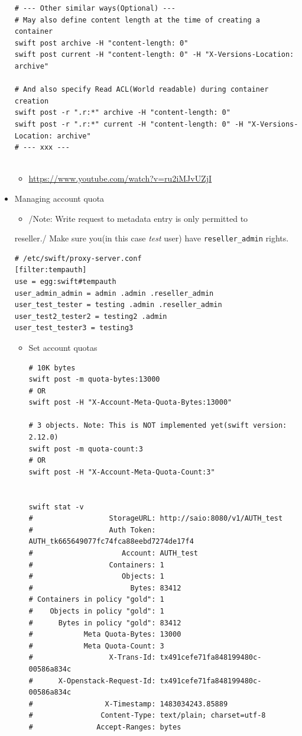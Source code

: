 \documentclass{article}
\begin{document}
\begin{itemize}
\begin{verbatim}
# --- Other similar ways(Optional) ---
# May also define content length at the time of creating a container
swift post archive -H "content-length: 0"
swift post current -H "content-length: 0" -H "X-Versions-Location: archive"

# And also specify Read ACL(World readable) during container creation
swift post -r ".r:*" archive -H "content-length: 0"
swift post -r ".r:*" current -H "content-length: 0" -H "X-Versions-Location: archive"
# --- xxx ---


\end{verbatim}

\begin{itemize}
\item \url{https://www.youtube.com/watch?v=ru2iMJvUZjI}
\end{itemize}

\item Managing account quota

\begin{itemize}
\item /Note: Write request to metadata entry is only permitted to
\end{itemize}
reseller./ Make sure you(in this case \emph{test} user) have
\texttt{reseller\_admin} rights.

\begin{verbatim}
# /etc/swift/proxy-server.conf
[filter:tempauth]
use = egg:swift#tempauth
user_admin_admin = admin .admin .reseller_admin
user_test_tester = testing .admin .reseller_admin
user_test2_tester2 = testing2 .admin
user_test_tester3 = testing3
\end{verbatim}

\begin{itemize}
\item Set account quotas

\begin{verbatim}
# 10K bytes
swift post -m quota-bytes:13000
# OR
swift post -H "X-Account-Meta-Quota-Bytes:13000"

# 3 objects. Note: This is NOT implemented yet(swift version: 2.12.0)
swift post -m quota-count:3
# OR
swift post -H "X-Account-Meta-Quota-Count:3"


swift stat -v
#                  StorageURL: http://saio:8080/v1/AUTH_test
#                  Auth Token: AUTH_tk665649077fc74fca88eebd7274de17f4
#                     Account: AUTH_test
#                  Containers: 1
#                     Objects: 1
#                       Bytes: 83412
# Containers in policy "gold": 1
#    Objects in policy "gold": 1
#      Bytes in policy "gold": 83412
#            Meta Quota-Bytes: 13000
#            Meta Quota-Count: 3
#                  X-Trans-Id: tx491cefe71fa848199480c-00586a834c
#      X-Openstack-Request-Id: tx491cefe71fa848199480c-00586a834c
#                 X-Timestamp: 1483034243.85889
#                Content-Type: text/plain; charset=utf-8
#               Accept-Ranges: bytes



\end{verbatim}
\end{itemize}
\end{itemize}
\end{document}
